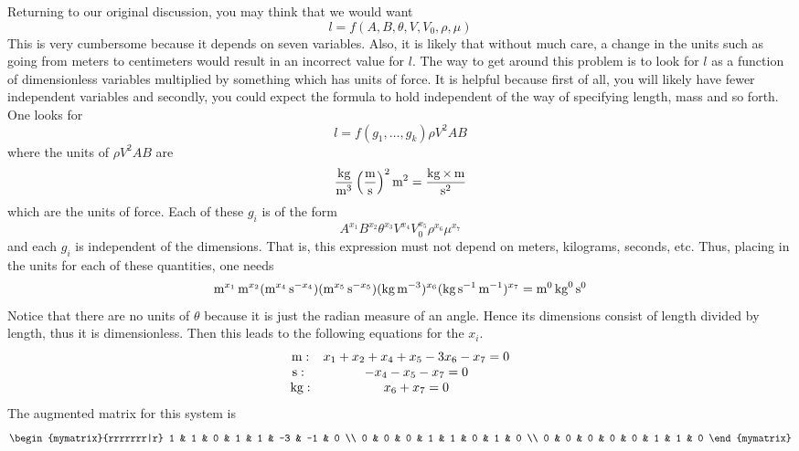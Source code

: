 Returning to our original discussion, you may think that we would want
\begin{equation*}
  l=f(A,B,\theta,V,V_0,\rho,\mu)
\end{equation*}
This is very cumbersome because it depends on seven variables. Also,
it is likely that without much care, a change in the units such as
going from meters to centimeters would result in an incorrect value
for $l$. The way to get around this problem is to look for $l $ as a
function of dimensionless variables multiplied by something which has
units of force. It is helpful because first of all, you will likely
have fewer independent variables and secondly, you could expect the
formula to hold independent of the way of specifying length, mass and
so forth. One looks for
\begin{equation*}
  l=f(g_1,\ldots,g_k) \rho V^2AB
\end{equation*}
where the units of $\rho V^2AB$ are
\begin{equation*}
  \frac{\mathop{\textrm{\rm kg}}\nolimits}{\mathop{\textrm{\rm m}}\nolimits^3}\left(\frac{\mathop{\textrm{\rm m}}\nolimits}{\mathop{\textrm{\rm s}}\nolimits }\right)^2\mathop{\textrm{\rm m}}\nolimits^2=\frac{\mathop{\textrm{\rm kg}}\nolimits\times \mathop{\textrm{\rm m}}\nolimits}{\mathop{\textrm{\rm s}}\nolimits^2}
\end{equation*}
which are the units of force. Each of these $g_i$ is of the form
\begin{equation}
  A^{x_1}B^{x_2}\theta^{x_3}V^{x_4}V_0^{x_5}\rho^{x_6}\mu
  ^{x_7}  \label{11-july-e1f}
\end{equation}
and each $g_i$ is independent of the dimensions. That is, this
expression must not depend on meters, kilograms, seconds, etc. Thus,
placing in the units for each of these quantities, one needs
\begin{equation*}
  \mathop{\textrm{\rm m}}\nolimits^{x_1}\mathop{\textrm{\rm m}}\nolimits^{x_2}(\mathop{\textrm{\rm m}}\nolimits^{x_4}\mathop{\textrm{\rm s}}\nolimits^{-x_4}) (\mathop{\textrm{\rm m}}\nolimits^{x_5}\mathop{\textrm{\rm s}}\nolimits
  ^{-x_5}) (\mathop{\textrm{\rm kg}}\nolimits\mathop{\textrm{\rm m}}\nolimits^{-3})^{x_6}(\mathop{\textrm{\rm kg}}\nolimits\mathop{\textrm{\rm s}}\nolimits
  ^{-1}\mathop{\textrm{\rm m}}\nolimits^{-1})^{x_7}=\mathop{\textrm{\rm m}}\nolimits^0\mathop{\textrm{\rm kg}}\nolimits^0\mathop{\textrm{\rm s}}\nolimits^0
\end{equation*}
Notice that there are no units of $\theta$ because it is just the
radian measure of an angle. Hence its dimensions consist of length
divided by length, thus it is dimensionless. Then this leads to the
following equations for the $x_i$.
\begin{equation*}
  \begin{array}{cc}
    \mathop{\textrm{\rm m}}\nolimits: & x_1+x_2+x_4+x_5-3x_6-x_7=0 \\
    \mathop{\textrm{\rm s}}\nolimits :\  & -x_4-x_5-x_7=0 \\
    \mathop{\textrm{\rm kg}}\nolimits: & x_6+x_7=0
  \end{array}
\end{equation*}
The augmented matrix for this system is
\begin{equation*}
  \begin{mymatrix}{rrrrrrr|r}
    1 & 1 & 0 & 1 & 1 & -3 & -1 & 0 \\
    0 & 0 & 0 & 1 & 1 & 0 & 1 & 0 \\
    0 & 0 & 0 & 0 & 0 & 1 & 1 & 0
  \end{mymatrix}
\end{equation*}
